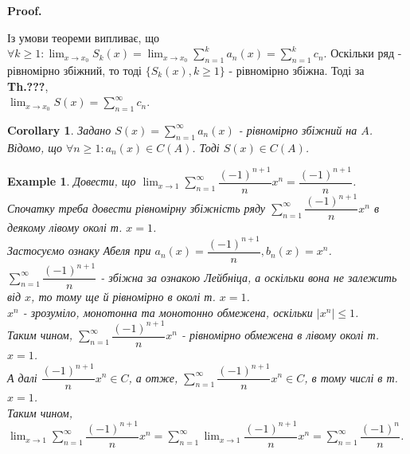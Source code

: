 \documentclass[a4paper, 10pt]{article}
\makeatletter
\def\huge{\displaystyle}
\def\qed{$\blacksquare$}
\theoremstyle{theoremdd}
\theoremstyle{theoremdd}
\theoremstyle{theoremdd}
\theoremstyle{theoremdd}
\theoremstyle{theoremdd}
\newtheorem{example}[theorem]{Example}
\theoremstyle{theoremdd}
\theoremstyle{theoremdd}
\theoremstyle{theoremdd}
\theoremstyle{theoremdd}
\newtheorem{corollary}[theorem]{Corollary}
\renewenvironment{proof}[1][Proof.\\]{\par
\pushQED{\hfill \qed}%
\normalfont \topsep6\p@\@plus6\p@\relax
\trivlist
\item\relax
{\bfseries
#1\@addpunct{.}}\hspace\labelsep\ignorespaces
}{%
\popQED\endtrivlist\@endpefalse
}
\makeatother
\begin{document}
\begin{proof}
Із умови теореми випливає, що $\forall k \geq 1: \huge\lim_{x \to x_0} S_k(x) = \lim_{x \to x_0} \huge\sum_{n=1}^k a_n(x) = \huge\sum_{n=1}^k c_n$. Оскільки ряд - рівномірно збіжний, то тоді $\{S_k(x), k \geq 1\}$ - рівномірно збіжна. Тоді за \textbf{Th.???}, \\
$\huge\lim_{x \to x_0} S(x) = \sum_{n=1}^\infty c_n$.
\end{proof}

\begin{corollary}
Задано $S(x) = \huge \sum_{n=1}^\infty a_n(x)$ - рівномірно збіжний на $A$.\\
Відомо, що $\forall n \geq 1: a_n(x) \in C(A)$. Тоді $S(x) \in C(A)$.
\end{corollary}

\begin{example}
Довести, що $\huge\lim_{x \to 1} \huge\sum_{n=1}^\infty \dfrac{(-1)^{n+1}}{n}x^n = \dfrac{(-1)^{n+1}}{n}$.\\
Спочатку треба довести рівномірну збіжність ряду $\huge\sum_{n=1}^\infty \dfrac{(-1)^{n+1}}{n} x^n$ в деякому лівому околі т. $x = 1$.\\
Застосуємо ознаку Абеля при $a_n(x) = \dfrac{(-1)^{n+1}}{n}, b_n(x) = x^n$.\\
$\huge\sum_{n=1}^\infty \dfrac{(-1)^{n+1}}{n}$ - збіжна за ознакою Лейбніца, а оскільки вона не залежить від $x$, то тому ще й рівномірно в околі т. $x = 1$.\\
$x^n$ - зрозуміло, монотонна та монотонно обмежена, оскільки $|x^n| \leq 1$.\\
Таким чином, $\huge\sum_{n=1}^\infty \dfrac{(-1)^{n+1}}{n} x^n$ - рівномірно обмежена в лівому околі т. $x=1$.\\
А далі $\dfrac{(-1)^{n+1}}{n} x^{n} \in C$, а отже, $\huge\sum_{n=1}^\infty \dfrac{(-1)^{n+1}}{n}x^n \in C$, в тому числі в т. $x=1$.\\
Таким чином, $\huge\lim_{x \to 1} \huge\sum_{n=1}^\infty \dfrac{(-1)^{n+1}}{n}x^n = \huge\sum_{n=1}^\infty \lim_{x \to 1}\dfrac{(-1)^{n+1}}{n}x^n = \sum_{n=1}^\infty \dfrac{(-1)^n}{n}$.
\end{example}
\end{document}
